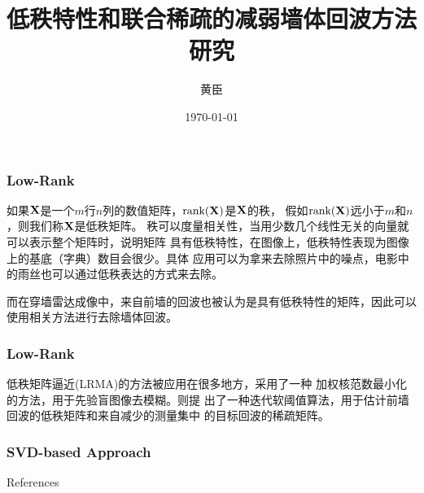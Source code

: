 \documentclass[12pt]{beamer}
\begin{document}
 
\title{低秩特性和联合稀疏的减弱墙体回波方法研究}  
\author{黄臣}  
\date{\today}  
\frame{\titlepage}  
\begin{frame}
  \frametitle{Low-Rank}
  如果$\bf X$是一个$m$行$n$列的数值矩阵，$\rm {rank(}\bf X\rm {)}$是$\bf X$的秩，
  假如$\rm {rank(}\bf X\rm {)}$远小于$m$和$n$，则我们称$\bf X$是低秩矩阵。
  秩可以度量相关性，当用少数几个线性无关的向量就可以表示整个矩阵时，说明矩阵
  具有低秩特性，在图像上，低秩特性表现为图像上的基底（字典）数目会很少。具体
  应用可以为拿来去除照片中的噪点，电影中的雨丝也可以通过低秩表达的方式来去除。

  而在穿墙雷达成像中，来自前墙的回波也被认为是具有低秩特性的矩阵，因此可以
  使用相关方法进行去除墙体回波。
\end{frame}
\begin{frame}
  \frametitle{Low-Rank}
  低秩矩阵逼近(LRMA)的方法被应用在很多地方，\citep{Ren2016Image}采用了一种
  加权核范数最小化的方法，用于先验盲图像去模糊。\citep{Tang2016Radar}则提
  出了一种迭代软阈值算法，用于估计前墙回波的低秩矩阵和来自减少的测量集中
  的目标回波的稀疏矩阵。
\end{frame}
\begin{frame}
  \frametitle{SVD-based Approach}
\end{frame}
\begin{frame}[allowframebreaks]{References}
  \footnotesize
   
   
\end{frame}
\end{document}
